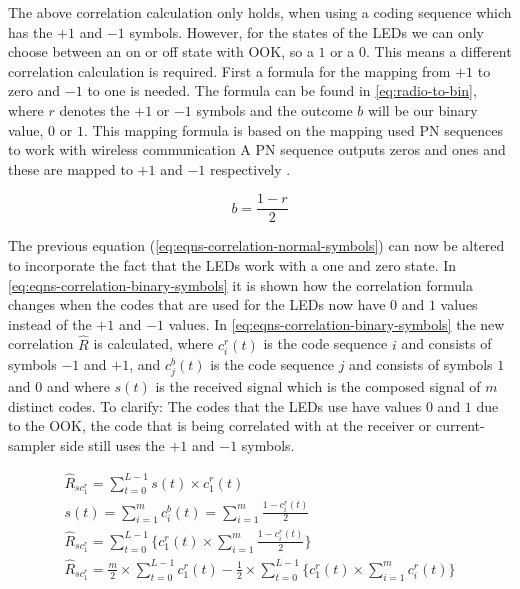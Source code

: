 The above correlation calculation only holds, when using a coding sequence which has the $+1$ and $-1$ symbols.
However, for the states of the LEDs we can only choose between an on or off state with OOK, so a $1$ or a $0$.
This means a different correlation calculation is required.
First a formula for the mapping from $+1$ to zero and $-1$ to one is needed.
The formula can be found in \autoref{eq:radio-to-bin}, where $r$ denotes the $+1$ or $-1$ symbols and the outcome $b$ will be our binary value, $0$ or $1$.
This mapping formula is based on the mapping used PN sequences to work with wireless communication
A PN sequence outputs zeros and ones and these are mapped to $+1$ and $-1$ respectively \cite{cdma-mapping-symbols-ref}.
 
\begin{equation}
	b = \frac{1 - r}{2}
	\label{eq:radio-to-bin}
\end{equation}


The previous equation (\autoref{eq:eqns-correlation-normal-symbols}) can now be altered to incorporate the fact that the LEDs work with a one and zero state.
In \autoref{eq:eqns-correlation-binary-symbols} it is shown how the correlation formula changes when the codes that are used for the LEDs now have $0$ and $1$ values instead of the $+1$ and $-1$ values.
In \autoref{eq:eqns-correlation-binary-symbols} the new correlation $\hat{R}$ is calculated, where $c^r_i(t)$ is the code sequence $i$ and consists of symbols $-1$ and $+1$, and $c^b_j(t)$ is the code sequence $j$ and consists of symbols $1$ and $0$ and where $s(t)$ is the received signal which is the composed signal of $m$ distinct codes.
To clarify: The codes that the LEDs use have values $0$ and $1$ due to the OOK, the code that is being correlated with at the receiver or current-sampler side still uses the $+1$ and $-1$ symbols.



\begin{equation}
	\begin{array}{l}
		\hat{R}_{sc^r_{1}} = \displaystyle\sum_{t = 0} ^ {L - 1} s(t) \times c^r_1(t)	 \\
		s(t) = \displaystyle\sum_{i = 1} ^ {m} c^b_i(t) = \displaystyle\sum_{i = 1} ^ {m} \frac{1 - c^r_i(t)}{2} \\
		\hat{R}_{sc^r_{1}} = \displaystyle\sum_{t = 0} ^ {L - 1} \Bigg\{  c^r_1(t)	\times \displaystyle\sum_{i = 1} ^ {m} \frac{1 - c^r_i(t)}{2}  	\Bigg\} \\
		\hat{R}_{sc^r_{1}} = \frac{m}{2} \times \displaystyle\sum_{t = 0} ^ {L - 1} c^r_1(t) - \frac{1}{2} \times \displaystyle\sum_{t = 0} ^ {L - 1}  \Bigg\{ c^r_1(t) \times \displaystyle\sum_{i = 1} ^ {m} c^r_i(t) \Bigg\}
	\end{array} 
	\label{eq:eqns-correlation-binary-symbols}
\end{equation}











